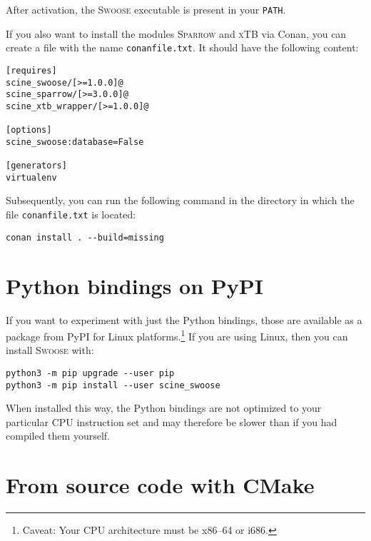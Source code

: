 \documentclass[]{tufte-book}
\begin{document}
After activation, the \textsc{Swoose} executable is present in your \texttt{PATH}.

If you also want to install the modules \textsc{Sparrow} and \textsc{xTB} via Conan, you can create a file with the name \texttt{conanfile.txt}. It should have the following content:

\begin{mdframed}[backgroundcolor=LightSteelBlue!25, linewidth=0pt]
\begin{verbatim}
[requires]
scine_swoose/[>=1.0.0]@
scine_sparrow/[>=3.0.0]@
scine_xtb_wrapper/[>=1.0.0]@

[options]
scine_swoose:database=False

[generators]
virtualenv
\end{verbatim}
\end{mdframed}

Subsequently, you can run the following command in the directory in which the file \texttt{conanfile.txt} is located:
\begin{mdframed}[backgroundcolor=LightSteelBlue!25, linewidth=0pt]
\begin{verbatim}
conan install . --build=missing
\end{verbatim}
\end{mdframed}

\section{Python bindings on PyPI}
If you want to experiment with just the Python bindings, those are available as
a package from PyPI for Linux platforms.\footnote{Caveat: Your CPU architecture
must be x86--64 or i686.} If you are using Linux, then you can install
\textsc{Swoose} with:

\begin{mdframed}[backgroundcolor=LightSteelBlue!25, linewidth=0pt]
\begin{verbatim}
python3 -m pip upgrade --user pip
python3 -m pip install --user scine_swoose
\end{verbatim}
\end{mdframed}

When installed this way, the Python bindings are not optimized to your
particular CPU instruction set and may therefore be slower than if you had
compiled them yourself.

\section{From source code with CMake}
\end{document}
